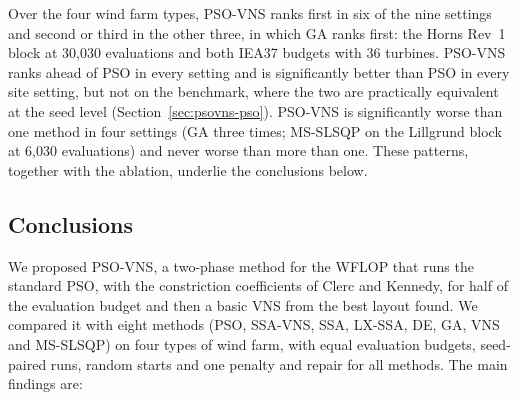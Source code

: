Over the four wind farm types, PSO-VNS ranks first in six of the nine settings and second or third in the other three, in which GA ranks first: the Horns Rev~1 block at 30,030 evaluations and both IEA37 budgets with 36 turbines. PSO-VNS ranks ahead of PSO in every setting and is significantly better than PSO in every site setting, but not on the benchmark, where the two are practically equivalent at the seed level (Section~\ref{sec:psovns-pso}). PSO-VNS is significantly worse than one method in four settings (GA three times; MS-SLSQP on the Lillgrund block at 6,030 evaluations) and never worse than more than one. These patterns, together with the ablation, underlie the conclusions below.

\subsection{Conclusions}
\label{sec:conclusion}
\label{sec:disc-where}
\label{sec:disc-practice}
We proposed PSO-VNS, a two-phase method for the WFLOP that runs the standard PSO, with the constriction coefficients of Clerc and Kennedy, for half of the evaluation budget and then a basic VNS from the best layout found. We compared it with eight methods (PSO, SSA-VNS, SSA, LX-SSA, DE, GA, VNS and MS-SLSQP) on four types of wind farm, with equal evaluation budgets, seed-paired runs, random starts and one penalty and repair for all methods. The main findings are:
